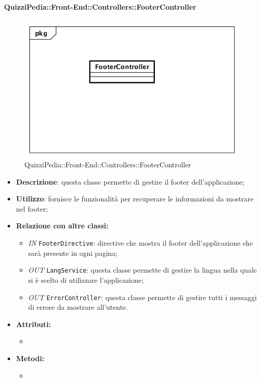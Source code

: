 \paragraph{QuizziPedia::Front-End::Controllers::FooterController}
\begin{figure}
	\centering
	\includegraphics[scale=0.45]{UML/Classi/Front-End/QuizziPedia_Front-end_Controller_FooterController.png}
	\caption{QuizziPedia::Front-End::Controllers::FooterController}
\end{figure}
\begin{itemize}
	\item \textbf{Descrizione}: questa classe permette di gestire il footer dell'applicazione;
	\item \textbf{Utilizzo}: fornisce le funzionalità per recuperare le informazioni da mostrare nel footer;
	\item \textbf{Relazione con altre classi:}
	\begin{itemize}
		\item \textit{IN} \texttt{FooterDirective}: directive che mostra il footer dell'applicazione che sarà presente in ogni pagina;  
		\item \textit{OUT} \texttt{LangService}: questa classe permette di gestire la lingua nella quale si è scelto di utilizzare l'applicazione;
		\item \textit{OUT} \texttt{ErrorController}: questa classe permette di gestire tutti i messaggi di errore da mostrare all'utente.
	\end{itemize}
	\item \textbf{Attributi:}
	\begin{itemize}
		\item 
	\end{itemize}
	\item \textbf{Metodi:}
	\begin{itemize}
		\item 
	\end{itemize}
\end{itemize}

